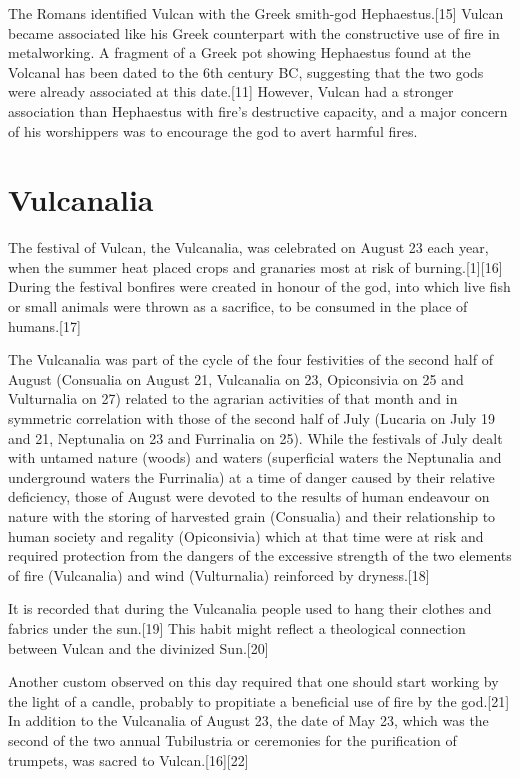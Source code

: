The Romans identified Vulcan with the Greek smith-god Hephaestus.[15] Vulcan became associated like his Greek counterpart with the constructive use of fire in metalworking. A fragment of a Greek pot showing Hephaestus found at the Volcanal has been dated to the 6th century BC, suggesting that the two gods were already associated at this date.[11] However, Vulcan had a stronger association than Hephaestus with fire's destructive capacity, and a major concern of his worshippers was to encourage the god to avert harmful fires.

\section{Vulcanalia}

The festival of Vulcan, the Vulcanalia, was celebrated on August 23 each year, when the summer heat placed crops and granaries most at risk of burning.[1][16] During the festival bonfires were created in honour of the god, into which live fish or small animals were thrown as a sacrifice, to be consumed in the place of humans.[17]

The Vulcanalia was part of the cycle of the four festivities of the second half of August (Consualia on August 21, Vulcanalia on 23, Opiconsivia on 25 and Vulturnalia on 27) related to the agrarian activities of that month and in symmetric correlation with those of the second half of July (Lucaria on July 19 and 21, Neptunalia on 23 and Furrinalia on 25). While the festivals of July dealt with untamed nature (woods) and waters (superficial waters the Neptunalia and underground waters the Furrinalia) at a time of danger caused by their relative deficiency, those of August were devoted to the results of human endeavour on nature with the storing of harvested grain (Consualia) and their relationship to human society and regality (Opiconsivia) which at that time were at risk and required protection from the dangers of the excessive strength of the two elements of fire (Vulcanalia) and wind (Vulturnalia) reinforced by dryness.[18]

It is recorded that during the Vulcanalia people used to hang their clothes and fabrics under the sun.[19] This habit might reflect a theological connection between Vulcan and the divinized Sun.[20]

Another custom observed on this day required that one should start working by the light of a candle, probably to propitiate a beneficial use of fire by the god.[21] In addition to the Vulcanalia of August 23, the date of May 23, which was the second of the two annual Tubilustria or ceremonies for the purification of trumpets, was sacred to Vulcan.[16][22]

